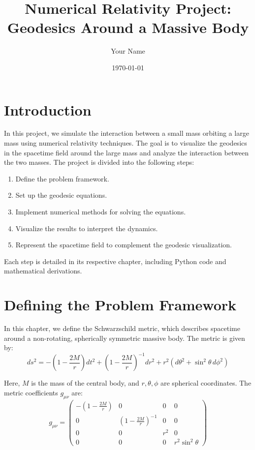 \documentclass[12pt]{article}
\title{Numerical Relativity Project: Geodesics Around a Massive Body}
\author{Your Name}
\date{\today}
\begin{document}
\maketitle

\tableofcontents

\newpage

\section*{Introduction}

In this project, we simulate the interaction between a small mass orbiting a large mass using numerical relativity techniques. The goal is to visualize the geodesics in the spacetime field around the large mass and analyze the interaction between the two masses. The project is divided into the following steps:
\begin{enumerate}
    \item Define the problem framework.
    \item Set up the geodesic equations.
    \item Implement numerical methods for solving the equations.
    \item Visualize the results to interpret the dynamics.
    \item Represent the spacetime field to complement the geodesic visualization.
\end{enumerate}

Each step is detailed in its respective chapter, including Python code and mathematical derivations.

\newpage

\section{Defining the Problem Framework}

In this chapter, we define the Schwarzschild metric, which describes spacetime around a non-rotating, spherically symmetric massive body. The metric is given by:
\[
ds^2 = -\left(1 - \frac{2M}{r}\right)dt^2 + \left(1 - \frac{2M}{r}\right)^{-1}dr^2 + r^2 \left(d\theta^2 + \sin^2\theta \, d\phi^2 \right)
\]

Here, \(M\) is the mass of the central body, and \(r, \theta, \phi\) are spherical coordinates. The metric coefficients \(g_{\mu\nu}\) are:
\[
g_{\mu\nu} = 
\begin{pmatrix}
-\left(1 - \frac{2M}{r}\right) & 0 & 0 & 0 \\
0 & \left(1 - \frac{2M}{r}\right)^{-1} & 0 & 0 \\
0 & 0 & r^2 & 0 \\
0 & 0 & 0 & r^2 \sin^2\theta
\end{pmatrix}
\]
\end{document}
